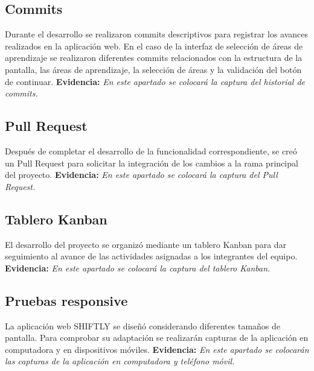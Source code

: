 \subsection{Commits}
Durante el desarrollo se realizaron commits descriptivos para registrar
los avances realizados en la aplicación web.
En el caso de la interfaz de selección de áreas de aprendizaje se
realizaron diferentes commits relacionados con la estructura de la
pantalla, las áreas de aprendizaje, la selección de áreas y la validación
del botón de continuar.
\textbf{Evidencia:}
\textit{En este apartado se colocará la captura del historial de commits.}
\subsection{Pull Request}
Después de completar el desarrollo de la funcionalidad correspondiente, se
creó un Pull Request para solicitar la integración de los cambios a la
rama principal del proyecto.
\textbf{Evidencia:}
\textit{En este apartado se colocará la captura del Pull Request.}
\subsection{Tablero Kanban}
El desarrollo del proyecto se organizó mediante un tablero Kanban para
dar seguimiento al avance de las actividades asignadas a los integrantes
del equipo.
\textbf{Evidencia:}
\textit{En este apartado se colocará la captura del tablero Kanban.}
\subsection{Pruebas responsive}
La aplicación web SHIFTLY se diseñó considerando diferentes tamaños de
pantalla. Para comprobar su adaptación se realizarán capturas de la
aplicación en computadora y en dispositivos móviles.
\textbf{Evidencia:}
\textit{En este apartado se colocarán las capturas de la aplicación en
computadora y teléfono móvil.}